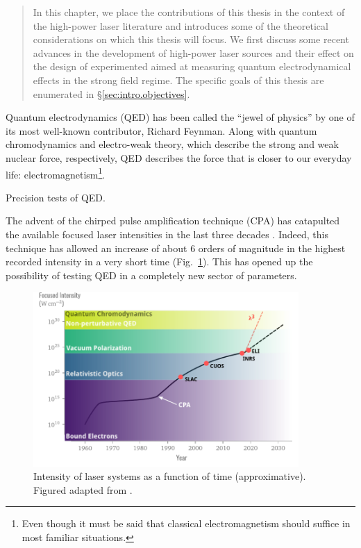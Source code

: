\documentclass[11pt,SymmetricalJury]{inrsthesis/inrsthesis}
\newenvironment{chaptersummary}{%
  \begin{quotation}
  \SingleSpacing
  \setlength{\parskip}{\baselineskip}}{%
  \end{quotation}}
\begin{document}
\begin{chaptersummary}
  In this chapter, we place the contributions of this thesis in the context
  of the high-power laser literature and introduces some of the theoretical
  considerations on which this thesis will focus. We first discuss some recent
  advances in the development of high-power laser sources and their effect
  on the design of experimented aimed at measuring quantum electrodynamical
  effects in the strong field regime. The specific goals of this thesis are
  enumerated in \S\ref{sec:intro.objectives}.
\end{chaptersummary}

Quantum electrodynamics (QED) has been called the ``jewel of physics'' by one
of its most well-known contributor, Richard Feynman. Along with quantum
chromodynamics and electro-weak theory, which describe the strong and
weak nuclear force, respectively, QED describes the force that is closer
to our everyday life: electromagnetism\footnote{Even though it must be
said that classical electromagnetism should suffice in most
familiar situations.}.

Precision tests of QED.


The advent of the chirped pulse amplification technique (CPA) has catapulted
the available focused laser intensities in the last three decades
\cite{Mourou2006}. Indeed, this technique has allowed an increase of about
6 orders of magnitude in the highest recorded intensity in a very short time
(Fig.~\ref{fig:intro.intensity-history}). This has opened up the possibility
of testing QED in a completely new sector of parameters.

\begin{figure}
  \centering
  \includegraphics[width=0.9\textwidth]{figs/IntensityHistory.pdf}
  \caption[Short history of the intensity of laser systems.]
          {Intensity of laser systems as a function of time (approximative).
            Figured adapted from \cite{Mourou2015}.}
  \label{fig:intro.intensity-history}
\end{figure}
\end{document}
